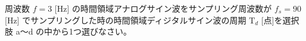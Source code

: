 周波数 $f = 3$ [Hz] の時間領域アナログサイン波をサンプリング周波数が $f_s = 90$ [Hz] でサンプリングした時の時間領域ディジタルサイン波の周期 $\textrm{T}_d$ [点]を選択肢 a〜d の中から1つ選びなさい。
